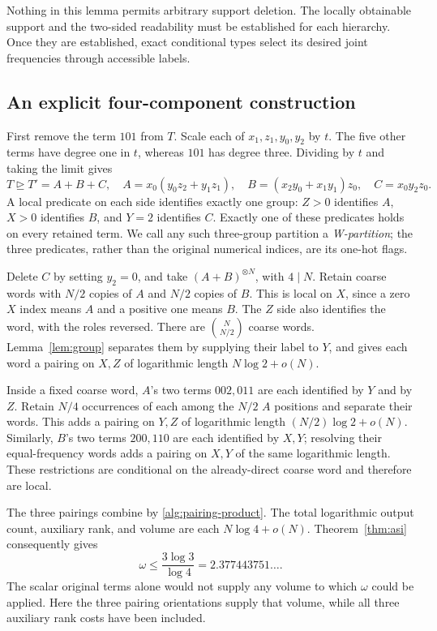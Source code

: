 Nothing in this lemma permits arbitrary support deletion.  The locally
obtainable support and the two-sided readability must be established for
each hierarchy.  Once they are established, exact conditional types select
its desired joint frequencies through accessible labels.

\subsection{An explicit four-component construction}
\label{alg:four}

First remove the term \(101\) from \(T\).  Scale each of
\(x_1,z_1,y_0,y_2\) by \(t\).  The five other terms have degree one in
\(t\), whereas \(101\) has degree three.  Dividing by \(t\) and taking
the limit gives
\begin{equation}
 T\unrhd T'=A+B+C,
 \quad
 A=x_0(y_0z_2+y_1z_1),\quad
 B=(x_2y_0+x_1y_1)z_0,\quad
 C=x_0y_2z_0.
 \label{alg:five}
\end{equation}
A local predicate on each side identifies exactly one group:
\(Z>0\) identifies \(A\), \(X>0\) identifies \(B\), and \(Y=2\)
identifies \(C\).  Exactly one of these predicates holds on every retained
term.  We call any such three-group partition a \emph{W-partition}; the
three predicates, rather than the original numerical indices, are its
one-hot flags.

Delete \(C\) by setting \(y_2=0\), and take \((A+B)^{\otimes N}\),
with \(4\mid N\).  Retain coarse words with \(N/2\) copies of \(A\)
and \(N/2\) copies of \(B\).  This is local on \(X\), since a zero
\(X\) index means \(A\) and a positive one means \(B\).
The \(Z\) side also identifies the word, with the roles reversed.
There are \(\binom{N}{N/2}\) coarse words.  Lemma~\ref{lem:group}
separates them by supplying their label to \(Y\), and gives each word a
pairing on \(X,Z\) of logarithmic length \(N\log2+o(N)\).

Inside a fixed coarse word, \(A\)'s two terms \(002,011\) are each
identified by \(Y\) and by \(Z\).  Retain \(N/4\) occurrences of each
among the \(N/2\) \(A\) positions and separate their words.  This adds a
pairing on \(Y,Z\) of logarithmic length \((N/2)\log2+o(N)\).
Similarly, \(B\)'s two terms \(200,110\) are each identified by
\(X,Y\); resolving their equal-frequency words adds a pairing on
\(X,Y\) of the same logarithmic length.  These restrictions are
conditional on the already-direct coarse word and therefore are local.

The three pairings combine by \eqref{alg:pairing-product}.  The total
logarithmic output count, auxiliary rank, and volume are each
\(N\log4+o(N)\).  Theorem~\ref{thm:asi} consequently gives
\begin{equation}
 \omega\leq\frac{3\log3}{\log4}=2.377443751\ldots.
 \label{alg:four-bound}
\end{equation}
The scalar original terms alone would not supply any volume to which
\(\omega\) could be applied.  Here the three pairing orientations supply
that volume, while all three auxiliary rank costs have been included.

